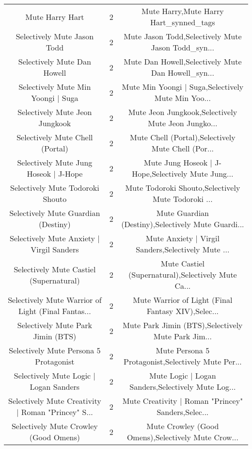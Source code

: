 \begin{table}[h!]
{\begin{tabular}{|c|c|c|}
                                   Mute Harry Hart &          2 &             Mute Harry,Mute Harry Hart\_synned\_tags \\
                       Selectively Mute Jason Todd &          2 & Mute Jason Todd,Selectively Mute Jason Todd\_syn... \\
                       Selectively Mute Dan Howell &          2 & Mute Dan Howell,Selectively Mute Dan Howell\_syn... \\
                Selectively Mute Min Yoongi | Suga &          2 & Mute Min Yoongi | Suga,Selectively Mute Min Yoo... \\
                    Selectively Mute Jeon Jungkook &          2 & Mute Jeon Jungkook,Selectively Mute Jeon Jungko... \\
                   Selectively Mute Chell (Portal) &          2 & Mute Chell (Portal),Selectively Mute Chell (Por... \\
             Selectively Mute Jung Hoseok | J-Hope &          2 & Mute Jung Hoseok | J-Hope,Selectively Mute Jung... \\
                  Selectively Mute Todoroki Shouto &          2 & Mute Todoroki Shouto,Selectively Mute Todoroki ... \\
               Selectively Mute Guardian (Destiny) &          2 & Mute Guardian (Destiny),Selectively Mute Guardi... \\
         Selectively Mute Anxiety | Virgil Sanders &          2 & Mute Anxiety | Virgil Sanders,Selectively Mute ... \\
           Selectively Mute Castiel (Supernatural) &          2 & Mute Castiel (Supernatural),Selectively Mute Ca... \\
Selectively Mute Warrior of Light (Final Fantas... &          2 & Mute Warrior of Light (Final Fantasy XIV),Selec... \\
                 Selectively Mute Park Jimin (BTS) &          2 & Mute Park Jimin (BTS),Selectively Mute Park Jim... \\
            Selectively Mute Persona 5 Protagonist &          2 & Mute Persona 5 Protagonist,Selectively Mute Per... \\
            Selectively Mute Logic | Logan Sanders &          2 & Mute Logic | Logan Sanders,Selectively Mute Log... \\
Selectively Mute Creativity | Roman "Princey" S... &          2 & Mute Creativity | Roman "Princey" Sanders,Selec... \\
             Selectively Mute Crowley (Good Omens) &          2 & Mute Crowley (Good Omens),Selectively Mute Crow... \\

\end{tabular}}
\end{table}
